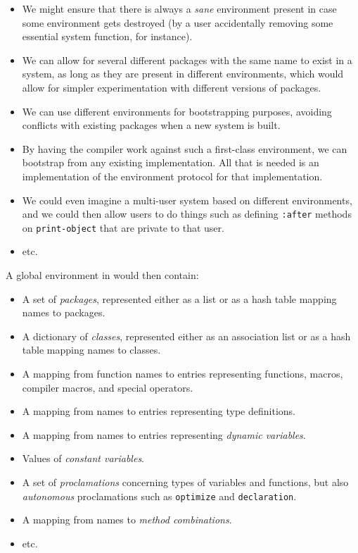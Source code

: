 \begin{itemize}
\item We might ensure that there is always a \emph{sane} environment
  present in case some environment gets destroyed (by a user
  accidentally removing some essential system function, for instance).
\item We can allow for several different packages with the same name
  to exist in a system, as long as they are present in different
  environments, which would allow for simpler experimentation with
  different versions of packages. 
\item We can use different environments for bootstrapping purposes,
  avoiding conflicts with existing packages when a new system is
  built.
\item By having the compiler work against such a first-class
  environment, we can bootstrap from any existing \commonlisp{}
  implementation.  All that is needed is an implementation of the
  environment protocol for that implementation.
\item We could even imagine a multi-user system based on different
  environments, and we could then allow users to do things such as
  defining \texttt{:after} methods on \texttt{print-object} that are
  private to that user. 
\item etc.
\end{itemize}

A global environment in \sysname{} would then contain:

\begin{itemize}
\item A set of \emph{packages}, represented either as a list or as a
  hash table mapping names to packages.
\item A dictionary of \emph{classes}, represented either as an
  association list or as a hash table mapping names to classes.
\item A mapping from function names to entries representing functions,
  macros, compiler macros, and special operators.
\item A mapping from names to entries representing type definitions.
\item A mapping from names to entries representing \emph{dynamic variables}.
\item Values of \emph{constant variables}.
\item A set of \emph{proclamations} concerning types of variables and
  functions, but also \emph{autonomous} proclamations such as
  \texttt{optimize} and \texttt{declaration}.
\item A mapping from names to \emph{method combinations}.
\item etc.
\end{itemize}

